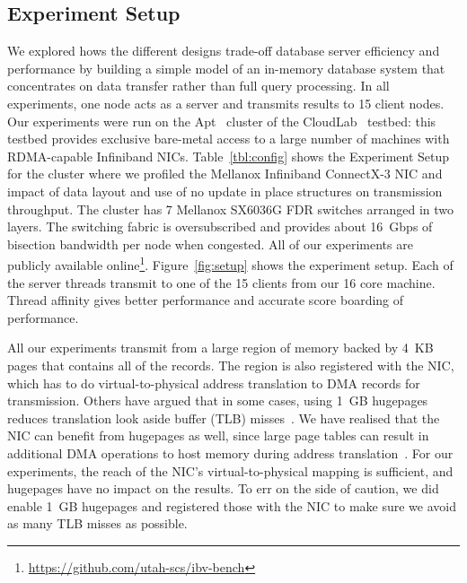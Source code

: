 \subsection{Experiment Setup}
We explored hows the different designs trade-off database server efficiency and
performance by building a simple model of an in-memory database system that
concentrates on data transfer rather than full query processing. In all experiments,
one node acts as a server and transmits results to 15 client nodes.
Our experiments were run on the Apt~\cite{Ricci+:OSR15} cluster of the
CloudLab~\cite{Cloudlab:URL} testbed: this testbed provides exclusive bare-metal
access to a large number of machines with RDMA-capable Infiniband NICs.
Table~\ref{tbl:config} shows the Experiment Setup for the cluster where we profiled
the Mellanox Infiniband ConnectX-3 \textregistered NIC and impact of data layout and 
use of no update in place structures on transmission throughput. The cluster has 7
Mellanox SX6036G FDR switches arranged in two layers. The switching fabric is
oversubscribed and provides about 16~Gbps of bisection bandwidth per node
when congested. All of our experiments are publicly available online\footnote{\url{https://github.com/utah-scs/ibv-bench}}.
Figure~\ref{fig:setup} shows the experiment setup. Each of the server threads transmit to one of the 15 clients from our 16 core machine. 
Thread affinity gives better performance and accurate score boarding of performance.


All our experiments transmit from a large region of memory backed by 4~KB pages
that contains all of the records. The region is also
registered with the NIC, which has to do virtual-to-physical address
translation to DMA records for transmission.
Others have argued that in some cases, using 1~GB hugepages reduces translation look aside buffer
(TLB) misses~\cite{infinibandhugepages}. We have realised that the NIC can benefit from
hugepages as well, since large page tables can result in additional
DMA operations to host memory during address translation~\cite{farm,rdma}. For
our experiments, the reach of the NIC's virtual-to-physical mapping is
sufficient, and hugepages have no impact on the results. To err on the side of caution, 
we did enable 1~GB hugepages and registered those with the NIC to make sure we 
avoid as many TLB misses as possible.



